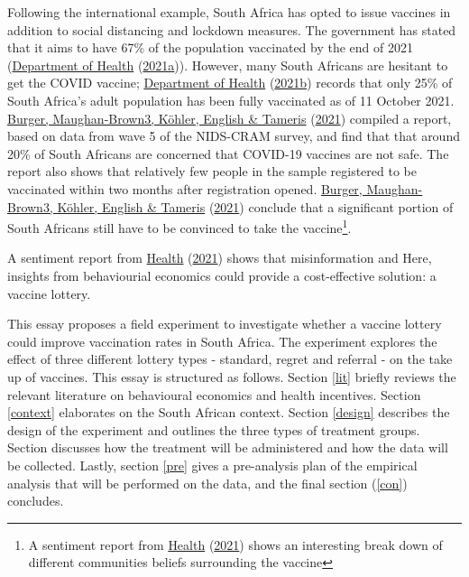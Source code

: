 \documentclass[11pt,preprint, authoryear]{elsarticle}
\numberwithin{equation}{section}
\numberwithin{figure}{section}
\numberwithin{table}{section}
\let\rmarkdownfootnote\footnote%
\def\footnote{\protect\rmarkdownfootnote}
\begin{document}
Following the international example, South Africa has opted to issue
vaccines in addition to social distancing and lockdown measures. The
government has stated that it aims to have 67\% of the population
vaccinated by the end of 2021 (\protect\hyperlink{ref-herd}{Department
of Health} (\protect\hyperlink{ref-herd}{2021a})). However, many South
Africans are hesitant to get the COVID vaccine;
\protect\hyperlink{ref-stat}{Department of Health}
(\protect\hyperlink{ref-stat}{2021b}) records that only 25\% of South
Africa's adult population has been fully vaccinated as of 11 October
2021. \protect\hyperlink{ref-cram}{Burger, Maughan-Brown3, Köhler,
English \& Tameris} (\protect\hyperlink{ref-cram}{2021}) compiled a
report, based on data from wave 5 of the NIDS-CRAM survey, and find that
that around 20\% of South Africans are concerned that COVID-19 vaccines
are not safe. The report also shows that relatively few people in the
sample registered to be vaccinated within two months after registration
opened. \protect\hyperlink{ref-cram}{Burger, Maughan-Brown3, Köhler,
English \& Tameris} (\protect\hyperlink{ref-cram}{2021}) conclude that a
significant portion of South Africans still have to be convinced to take
the vaccine\footnote{A sentiment report from
  \protect\hyperlink{ref-dep}{Health}
  (\protect\hyperlink{ref-dep}{2021}) shows an interesting break down of
  different communities beliefs surrounding the vaccine}.

A sentiment report from \protect\hyperlink{ref-dep}{Health}
(\protect\hyperlink{ref-dep}{2021}) shows that misinformation and Here,
insights from behaviourial economics could provide a cost-effective
solution: a vaccine lottery.

This essay proposes a field experiment to investigate whether a vaccine
lottery could improve vaccination rates in South Africa. The experiment
explores the effect of three different lottery types - standard, regret
and referral - on the take up of vaccines. This essay is structured as
follows. Section \ref{lit} briefly reviews the relevant literature on
behavioural economics and health incentives. Section \ref{context}
elaborates on the South African context. Section \ref{design} describes
the design of the experiment and outlines the three types of treatment
groups. Section \label{treat} discusses how the treatment will be
administered and how the data will be collected. Lastly, section
\ref{pre} gives a pre-analysis plan of the empirical analysis that will
be performed on the data, and the final section (\ref{con}) concludes.
\end{document}
